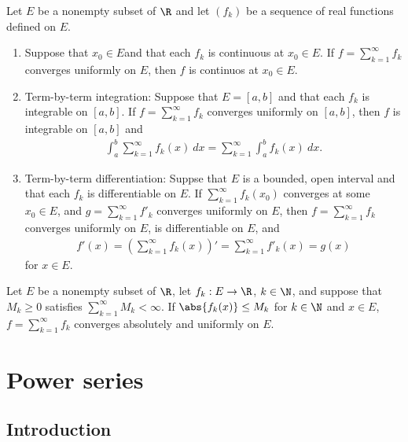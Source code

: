 \documentclass{article}
\begin{document}
\begin{theorem}[Notes 2.4]
    Let $E$ be a nonempty subset of $\R$ and let $(f_k)$ be a sequence of real functions defined on $E$.
    \begin{enumerate}
        \item Suppose that $x_0\in E$and that each $f_k$ is continuous at $x_0\in E$. 
            If $f=\sum_{k=1}^\infty f_k$ converges uniformly on $E$, then $f$ is continuos at $x_0\in E$.
        \item Term-by-term integration: Suppose that $E=[a,b]$ and that each $f_k$ is integrable on $[a,b]$.
            If $f=\sum_{k=1}^\infty f_k$ converges uniformly on $[a,b]$, then $f$ is integrable on $[a,b]$
            and \begin{align*}
                \int_a^b \sum_{k=1}^\infty f_k(x)\:dx = \sum_{k=1}^\infty \int_a^b f_k(x)\:dx.
            \end{align*}
        \item Term-by-term differentiation: Suppse that $E$ is a bounded, open interval and that each 
            $f_k$ is differentiable on $E$. If $\sum_{k=1}^\infty f_k(x_0)$ converges at some $x_0\in E$,
            and $g=\sum_{k=1}^\infty f'_k$ converges uniformly on $E$, then $f=\sum_{k=1}^\infty f_k$ 
            converges uniformly on $E$, is differentiable on $E$, and \begin{align*}
                f'(x) = \left(\sum_{k=1}^\infty f_k(x)\right)' = \sum_{k=1}^\infty f'_k(x)= g(x) 
            \end{align*}
            for $x\in E$.
    \end{enumerate}
\end{theorem}

\begin{theorem}
    Let $E$ be a nonempty subset of $\R$, let $f_k:E\to\R$, $k\in\N$, and suppose that $M_k\geq 0$
    satisfies $\sum_{k=1}^\infty M_k<\infty$. If $\abs{f_k(x)}\leq M_k$ for $k\in\N$ and $x\in E$,
    $f=\sum_{k=1}^\infty f_k$ converges absolutely and uniformly on $E$.
\end{theorem}

\section{Power series}

\subsection{Introduction}
\end{document}
